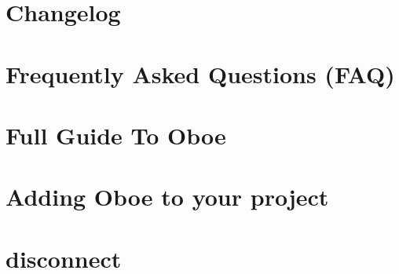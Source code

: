 \let\mypdfximage\pdfximage\def\pdfximage{\immediate\mypdfximage}\documentclass[twoside]{book}
\newcommand{\+}{\discretionary{\mbox{\scriptsize$\hookleftarrow$}}{}{}}
\begin{document}
\chapter{Changelog}
\label{md__c_1__users_fab_src__github_branches__neural_amp_modeler_plugin_i_plug2__dependencies__build_9fed42f76f1e41e3dc56c7c2643a07e4}

\chapter{Frequently Asked Questions (F\+AQ)}
\label{md__c_1__users_fab_src__github_branches__neural_amp_modeler_plugin_i_plug2__dependencies__build_9cdc3e4e34eb81a8ec84d72d176df884}

\chapter{Full Guide To Oboe}
\label{md__c_1__users_fab_src__github_branches__neural_amp_modeler_plugin_i_plug2__dependencies__build_a3b9fe65610b236c0cc2198d6b79f267}

\chapter{Adding Oboe to your project}
\label{md__c_1__users_fab_src__github_branches__neural_amp_modeler_plugin_i_plug2__dependencies__build_391f749b458abcaa3f076dcb1e638e9a}

\chapter{disconnect}
\label{md__c_1__users_fab_src__github_branches__neural_amp_modeler_plugin_i_plug2__dependencies__build_ca33675fad48fe50c92002d706637079}

\end{document}
